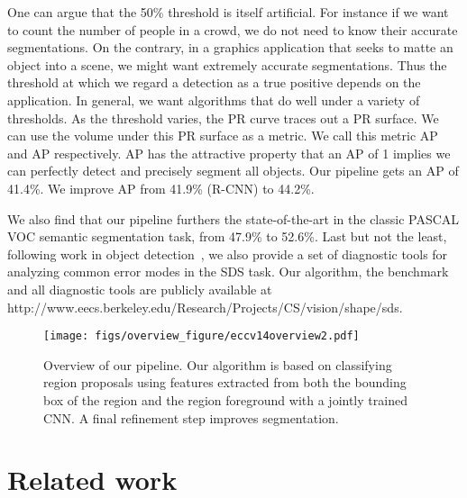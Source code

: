 \documentclass[runningheads]{llncs}
\begin{document}
One can argue that the 50\% threshold is itself artificial. For instance if we want to count the number of people in a crowd, we do not need to know their accurate segmentations. On the contrary, in a graphics application that seeks to matte an object into a scene, we might want extremely accurate segmentations. Thus the threshold at which we regard a detection as a true positive depends on the application. In general, we want algorithms that do well under a variety of thresholds. As the threshold varies, the PR curve traces out a PR surface. We can use the volume under this PR surface as a metric. We call this metric AP and AP respectively. AP has the attractive property that an AP of 1 implies we can perfectly detect and precisely segment all objects. Our pipeline gets an AP of 41.4\%. We improve AP from 41.9\% (R-CNN) to 44.2\%.

We also find that our pipeline furthers the state-of-the-art in the classic PASCAL VOC semantic segmentation task, from 47.9\% to 52.6\%. Last but not the least, following work in object detection~\cite{HoiemECCV12},  we also provide a set of diagnostic tools for analyzing common error modes in the SDS task. 
Our algorithm, the benchmark and all diagnostic tools are publicly available at http://www.eecs.berkeley.edu/Research/Projects/CS/vision/shape/sds.

\begin{figure}
\centering
\texttt{[image: figs/overview\_figure/eccv14overview2.pdf]}
\caption{Overview of our pipeline. Our algorithm is based on classifying region proposals using features extracted from both the bounding box of the region and the region foreground with a jointly trained CNN. A final refinement step improves segmentation.}
\label{fig:overview}
\end{figure}

\section{Related work}
\end{document}
